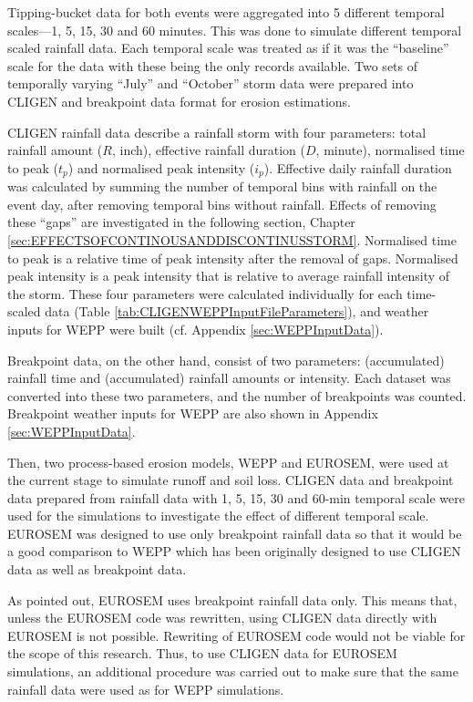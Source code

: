 Tipping-bucket data for both events were aggregated into 5 different temporal
scales---1, 5, 15, 30 and 60 minutes. This was done to simulate different
temporal scaled rainfall data. Each temporal scale was treated as if it was the
``baseline'' scale for the data with these being the only records available. Two
sets of temporally varying ``July'' and ``October'' storm data were prepared
into CLIGEN and breakpoint data format for erosion estimations.

CLIGEN rainfall data describe a rainfall storm with four parameters: total
rainfall amount ($R$, inch), effective rainfall duration ($D$, minute),
normalised time to peak ($t_p$) and normalised peak intensity ($i_p$). Effective
daily rainfall duration was calculated by summing the number of temporal bins
with rainfall on the event day, after removing temporal bins without rainfall.
Effects of removing these ``gaps'' are investigated in the following section,
Chapter \ref{sec:EFFECTSOFCONTINOUSANDDISCONTINUSSTORM}. Normalised time to
peak is a relative time of peak intensity after the removal of gaps.
Normalised peak intensity is a peak intensity that is relative to average
rainfall intensity of the storm. These four parameters were calculated
individually for each time-scaled data (Table
\ref{tab:CLIGENWEPPInputFileParameters}), and weather inputs for WEPP were
built (cf. Appendix \ref{sec:WEPPInputData}).

Breakpoint data, on the other hand, consist of two parameters: (accumulated)
rainfall time and (accumulated) rainfall amounts or intensity. Each dataset was
converted into these two parameters, and the number of breakpoints was counted.
Breakpoint weather inputs for WEPP are also shown in Appendix
\ref{sec:WEPPInputData}.

Then, two process-based erosion models, WEPP and EUROSEM, were used at the
current stage to simulate runoff and soil loss. CLIGEN data and breakpoint data
prepared from rainfall data with 1, 5, 15, 30 and 60-min temporal scale were
used for the simulations to investigate the effect of different temporal scale.
EUROSEM was designed to use only breakpoint rainfall data so that it would
be a good comparison to WEPP which has been originally designed to use CLIGEN
data as well as breakpoint data.

As pointed out, EUROSEM uses breakpoint rainfall data only. This means that,
unless the EUROSEM code was rewritten, using CLIGEN data directly with EUROSEM
is not possible. Rewriting of EUROSEM code would not be viable for the scope of
this research. Thus, to use CLIGEN data for EUROSEM simulations, an additional
procedure was carried out to make sure that the same rainfall data were used as
for WEPP simulations.

